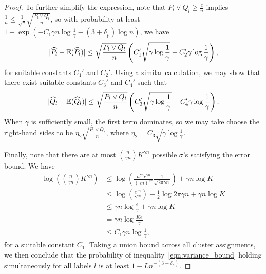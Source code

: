 \documentclass{article}
\begin{document}
\begin{proof}
To further simplify the expression, note that $P_l \vee Q_l \geq \frac{c}{n}$ implies $\frac{1}{n} \leq \frac{1}{\sqrt c}\sqrt{ \frac{P_l \vee Q_l}{n} }$, so with probability at least $1 - \exp( - C_1 \gamma n \log \frac{1}{\gamma} - (3 + \delta_p) \log n)$, we have
\begin{align}
| \widehat{P}_l - {\mathbb E}(\widehat{P}_l)| \leq \sqrt{ \frac{P_l \vee Q_l}{n} } \left( C_1' \sqrt{\gamma \log \frac{1}{\gamma}} + C_2' \gamma \log \frac{1}{\gamma} \right), \label{eqn:variance_bound}
\end{align}
for suitable constants $C_1'$ and $C_2'$. Using a similar calculation, we may show that there exist suitable constants $C_3'$ and $C_4'$ such that
\begin{align*}
| \widehat{Q}_l - {\mathbb E}(\widehat{Q}_l)| \leq \sqrt{ \frac{P_l \vee Q_l}{n} } \left( C_3' \sqrt{\gamma \log \frac{1}{\gamma}} + C_4' \gamma \log \frac{1}{\gamma} \right).
\end{align*}
When $\gamma$ is sufficiently small, the first term dominates, so we may take choose the right-hand sides to be $\eta_2 \sqrt{ \frac{P_l \vee Q_l}{n} }$, where $\eta_2 = C_3 \sqrt{\gamma \log \frac{1}{\gamma}}$.

Finally, note that there are at most $\binom{n}{\gamma n} K^{\gamma n}$ possible $\sigma$'s satisfying the error bound. We have
\begin{align*}
\log \left(\binom{n}{\gamma n} K^{\gamma n}\right)
 & \leq \log \left( \frac{ n^{\gamma n} e^{\gamma n} }
     { (\gamma n)^{\gamma n} } \frac{1}{\sqrt{2\pi \gamma n}} \right) + \gamma n \log K \\
 & \leq \log \left( \frac{ e^{\gamma n} }{\gamma^{\gamma n}} \right) - \frac{1}{2} \log 2 \pi \gamma n + \gamma n \log K \\
 & \leq \gamma n \log \frac{e}{\gamma}  + \gamma n \log K \\
 & = \gamma n \log \frac{Ke}{\gamma}\\
 &\leq C_1 \gamma n\log \frac{1}{\gamma},
\end{align*}
for a suitable constant $C_1$. Taking a union bound across all cluster assignments, we then conclude that the probability of inequality~\eqref{eqn:variance_bound} holding simultaneously for all labels $l$ is at least $1 - L n^{-(3+\delta_p)}$.


\end{proof}
\end{document}
